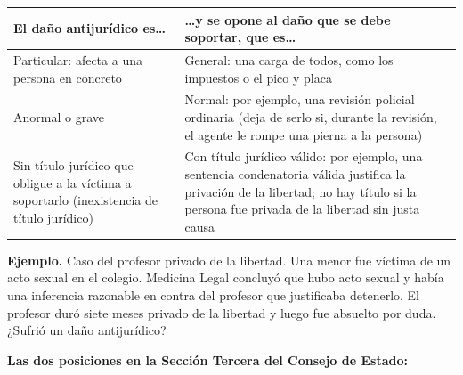 \begin{tabla}
\begin{longtable}{|>{\raggedright\arraybackslash}m{}|>{\raggedright\arraybackslash}m{}|}
\hline
\cellcolor[HTML]{1F3864}\textcolor[HTML]{FFFFFF}{\textbf{El daño antijurídico es…}} & \cellcolor[HTML]{1F3864}\textcolor[HTML]{FFFFFF}{\textbf{…y se opone al daño que se debe soportar, que es…}} \\ \hline
Particular: afecta a una persona en concreto & General: una carga de todos, como los impuestos o el pico y placa \\ \hline
\cellcolor[HTML]{F2F5FA}Anormal o grave & \cellcolor[HTML]{F2F5FA}Normal: por ejemplo, una revisión policial ordinaria (deja de serlo si, durante la revisión, el agente le rompe una pierna a la persona) \\ \hline
Sin título jurídico que obligue a la víctima a soportarlo (inexistencia de título jurídico) & Con título jurídico válido: por ejemplo, una sentencia condenatoria válida justifica la privación de la libertad; no hay título si la persona fue privada de la libertad sin justa causa \\ \hline
\end{longtable}
\end{tabla}
\begin{ejemplo}
\textcolor[HTML]{4F6228}{\textbf{Ejemplo. }}Caso del profesor privado de la libertad. Una menor fue víctima de un acto sexual en el colegio. Medicina Legal concluyó que hubo acto sexual y había una inferencia razonable en contra del profesor que justificaba detenerlo. El profesor duró siete meses privado de la libertad y luego fue absuelto por duda. ¿Sufrió un daño antijurídico?
\end{ejemplo}
\textbf{Las dos posiciones en la Sección Tercera del Consejo de Estado:}

